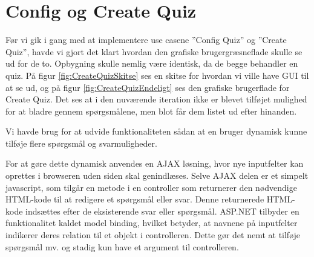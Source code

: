 \section{Config og Create Quiz}
Før vi gik i gang med at implementere use casene ''Config Quiz'' og ''Create Quiz'', havde vi gjort det klart hvordan den grafiske brugergræsneflade skulle se ud for de to. Opbygning skulle nemlig være identisk, da de begge behandler en quiz. På figur \ref{fig:CreateQuizSkitse} ses en skitse for hvordan vi ville have GUI til at se ud, og på figur \ref{fig:CreateQuizEndeligt} ses den grafiske brugerflade for Create Quiz. Det ses at i den nuværende iteration ikke er blevet tilføjet mulighed for at bladre gennem spørgsmålene, men blot får dem listet ud efter hinanden.

\begin{minipage}{0.45\textwidth}
\end{minipage}
\begin{minipage}{0.55\textwidth}
\end{minipage}

\vspace{6 mm}

Vi havde brug for at udvide funktionaliteten sådan at en bruger dynamisk kunne tilføje flere spørgsmål og svarmuligheder.

For at gøre dette dynamisk anvendes en AJAX løsning, hvor nye inputfelter kan oprettes i browseren uden siden skal genindlæses.
Selve AJAX delen er et simpelt javascript, som tilgår en metode i en controller som returnerer den nødvendige HTML-kode til at redigere et spørgsmål eller svar. Denne returnerede HTML-kode indsættes efter de eksisterende svar eller spørgsmål. ASP.NET tilbyder en funktionalitet kaldet model binding, hvilket betyder, at navnene på inputfelter indikerer deres relation til et objekt i controlleren. Dette gør det nemt at tilføje spørgsmål mv. og stadig kun have et argument til controlleren.